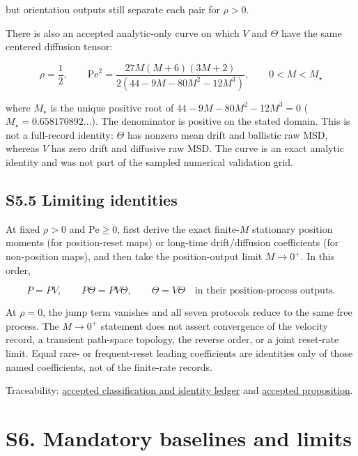 but orientation outputs still separate each pair for \(\rho>0\).

There is also an accepted analytic-only curve on which \(V\) and \(\Theta\) have the same centered diffusion tensor:

\[
\boxed{
\rho=\frac12,\qquad
\mathrm{Pe}^2=
\frac{27M(M+6)(3M+2)}
{2(44-9M-80M^2-12M^3)},\qquad
0<M<M_\star
}
\]

where \(M_\star\) is the unique positive root of \(44-9M-80M^2-12M^3=0\) (\(M_\star=0.658170892\ldots\)). The denominator is positive on the stated domain. This is not a full-record identity: \(\Theta\) has nonzero mean drift and ballistic raw MSD, whereas \(V\) has zero drift and diffusive raw MSD. The curve is an exact analytic identity and was not part of the sampled numerical validation grid.

\subsection{S5.5 Limiting identities}\label{s5.5-limiting-identities}

At fixed \(\rho>0\) and \(\mathrm{Pe}\ge0\), first derive the exact finite-\(M\) stationary position moments (for position-reset maps) or long-time drift/diffusion coefficients (for non-position maps), and then take the position-output limit \(M\to0^+\). In this order,

\[
P=PV,\qquad
P\Theta=PV\Theta,\qquad
\Theta=V\Theta
\quad\text{in their position-process outputs}.
\]

At \(\rho=0\), the jump term vanishes and all seven protocols reduce to the same free process. The \(M\to0^+\) statement does not assert convergence of the velocity record, a transient path-space topology, the reverse order, or a joint reset-rate limit. Equal rare- or frequent-reset leading coefficients are identities only of those named coefficients, not of the finite-rate records.

Traceability: \href{https://github.com/blakepi/phasemap-reproducibility/blob/v3.1.1/artifacts/derived/V-020-equivalence-map.md}{accepted classification and identity ledger} and \href{https://github.com/blakepi/phasemap-reproducibility/blob/v3.1.1/artifacts/derived/T-030-memory-channel-proposition.md}{accepted proposition}.

\section{S6. Mandatory baselines and limits}\label{s6.-mandatory-baselines-and-limits}

